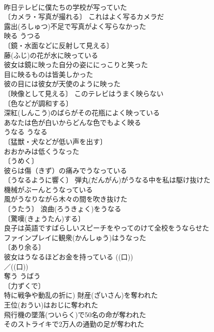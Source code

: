 \documentclass[8pt]{extreport}
\begin{document}
\begin{CJK}{UTF8}{min}
\\	昨日テレビに僕たちの学校が写っていた 
\\	〔カメラ・写真が撮れる〕 これはよく写るカメラだ 
\\	露出(ろしゅつ)不足で写真がよく写らなかった 
\\	映る	うつる	
\\	〔鏡・水面などに反射して見える〕
\\	藤(ふじ)の花が水に映っている 
\\	彼女は鏡に映った自分の姿ににっこりと笑った 
\\	目に映るものは皆美しかった 
\\	彼の目には彼女が天使のように映った 
\\	〔映像として見える〕 このテレビはうまく映らない 
\\	〔色などが調和する〕
\\	深紅(しんこう)のばらがその花瓶によく映っている 
\\	あなたは色が白いからどんな色でもよく映る 
\\	うなる	うなる	
\\	〔猛獣・犬などが低い声を出す〕
\\	おおかみは低くうなった 
\\	〔うめく〕
\\	彼らは傷（きず）の痛みでうなっている 
\\	〔うなるように響く〕 弾丸(だんがん)がうなる中を私は駆け抜けた 
\\	機械がぶーんとうなっている 
\\	風がうなりながら木々の間を吹き抜けた 
\\	〔うたう〕 浪曲(ろうきょく)をうなる 
\\	〔驚嘆(きょうたん)する〕
\\	良子は英語ですばらしいスピーチをやってのけて全校をうならせた 
\\	ファインプレイに観衆(かんしゅう)はうなった 
\\	〔あり余る〕　
\\	彼女はうなるほどお金を持っている ((口)) 
\\	／((口)) 
\\	奪う	うばう	
\\	〔力ずくで〕
\\	特に戦争や動乱の折に) 財産(ざいさん)を奪われた 
\\	王位(おうい)はおじに奪われた 
\\	飛行機の墜落(ついらく)で50名の命が奪われた 
\\	そのストライキで2万人の通勤の足が奪われた 

\end{CJK}
\end{document}
